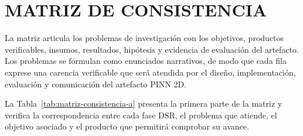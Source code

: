 \section{MATRIZ DE CONSISTENCIA}
\label{anx:matriz-consistencia}
\thispagestyle{empty}
\scriptsize
La matriz articula los problemas de investigación con los objetivos, productos verificables, insumos, resultados, hipótesis y evidencia de evaluación del artefacto. Los problemas se formulan como enunciados narrativos, de modo que cada fila exprese una carencia verificable que será atendida por el diseño, implementación, evaluación y comunicación del artefacto PINN 2D.

La Tabla~\ref{tab:matriz-consistencia-a} presenta la primera parte de la matriz y verifica la correspondencia entre cada fase DSR, el problema que atiende, el objetivo asociado y el producto que permitirá comprobar su avance.

\setlength{\tabcolsep}{3pt}
\renewcommand{\arraystretch}{1.18}

